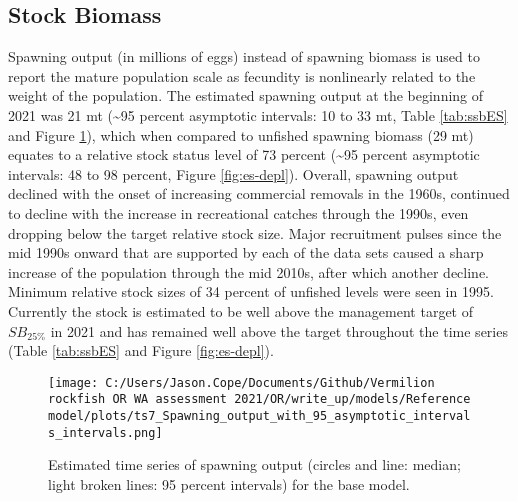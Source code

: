 \documentclass[11pt,
  english,
  a4paper,
]{article}
\begin{document}
\leavevmode\tagmcend\tagstructend\par


\hypertarget{stock-biomass}{%
\subsection*{Stock Biomass}\label{stock-biomass}}

\leavevmode\tagmcend\tagstructend


Spawning output (in millions of eggs) instead of spawning biomass is used to report the mature population scale as fecundity is nonlinearly related to the weight of the population. The estimated spawning output at the beginning of 2021 was 21 mt (\textasciitilde95 percent asymptotic intervals: 10 to 33 mt, Table \ref{tab:ssbES} and Figure \ref{fig:es-ssb}), which when compared to unfished spawning biomass (29 mt) equates to a relative stock status level of 73 percent (\textasciitilde95 percent asymptotic intervals: 48 to 98 percent, Figure \ref{fig:es-depl}). Overall, spawning output declined with the onset of increasing commercial removals in the 1960s, continued to decline with the increase in recreational catches through the 1990s, even dropping below the target relative stock size. Major recruitment pulses since the mid 1990s onward that are supported by each of the data sets caused a sharp increase of the population through the mid 2010s, after which another decline. Minimum relative stock sizes of 34 percent of unfished levels were seen in 1995. Currently the stock is estimated to be well above the management target of {\(SB_{25\%}\)\leavevmode\tagmcend\tagstructend} in 2021 and has remained well above the target throughout the time series (Table \ref{tab:ssbES} and Figure \ref{fig:es-depl}).

\leavevmode\tagmcend\tagstructend\par




\begin{figure}
\centering
\texttt{[image: C:/Users/Jason.Cope/Documents/Github/Vermilion rockfish OR WA assessment 2021/OR/write\_up/models/Reference model/plots/ts7\_Spawning\_output\_with\_95\_asymptotic\_intervals\_intervals.png]}
\caption{Estimated time series of spawning output (circles and line: median; light broken lines: 95 percent intervals) for the base model.\label{fig:es-ssb}}
\end{figure}
\end{document}
